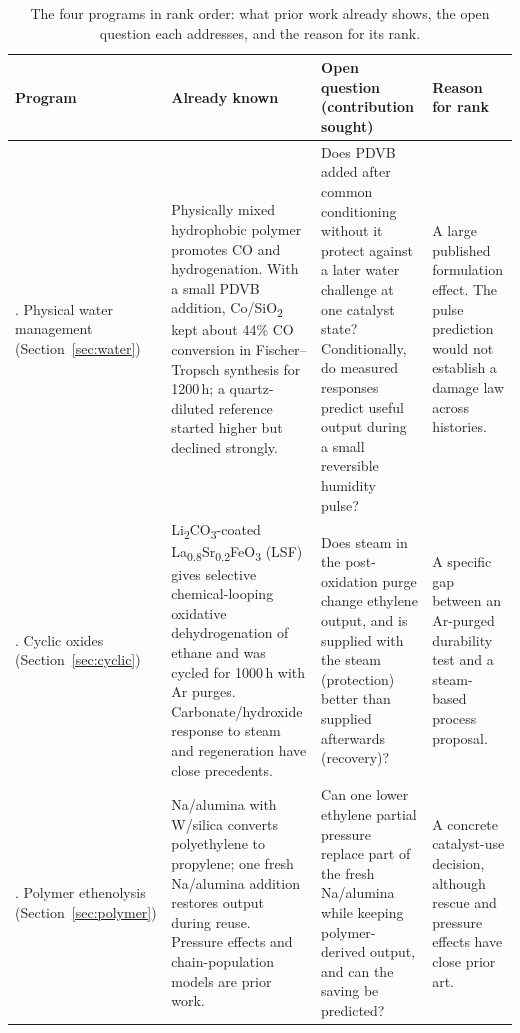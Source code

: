 \begin{table}[htbp]
\centering
\footnotesize
\renewcommand{\arraystretch}{1.2}
\caption{The four programs in rank order: what prior work already shows, the open question each addresses, and the reason for its rank.}
\label{tab:overview-ranking}
\begin{tabularx}{\textwidth}{@{}>{\raggedright\arraybackslash}p{}>{\raggedright\arraybackslash}X>{\raggedright\arraybackslash}X>{\raggedright\arraybackslash}p{}@{}}
\toprule
Program & Already known & Open question (contribution sought) & Reason for rank\\
\midrule
1. Physical water management (Section~\ref{sec:water}) & Physically mixed hydrophobic polymer promotes CO and \COtwo{} hydrogenation.\cite{fang2022,li2023} With a small PDVB addition, Co/SiO\textsubscript{2} kept about 44\% CO conversion in Fischer--Tropsch synthesis for 1200\,h; a quartz-diluted reference started higher but declined strongly.\cite{fang2026} & Does PDVB added after common conditioning without it protect against a later water challenge at one catalyst state? Conditionally, do measured responses predict useful output during a small reversible humidity pulse? & A large published formulation effect. The pulse prediction would not establish a damage law across histories.\\
2. Cyclic oxides (Section~\ref{sec:cyclic}) & Li\textsubscript{2}CO\textsubscript{3}-coated La\textsubscript{0.8}Sr\textsubscript{0.2}FeO\textsubscript{3} (LSF) gives selective chemical-looping oxidative dehydrogenation of ethane and was cycled for 1000\,h with Ar purges.\cite{gao2020,brody2022} Carbonate/hydroxide response to steam and \COtwo{} regeneration have close precedents.\cite{barckholtz2021,chacko2025thesis,fereres2018} & Does steam in the post-oxidation purge change ethylene output, and is \COtwo{} supplied with the steam (protection) better than \COtwo{} supplied afterwards (recovery)? & A specific gap between an Ar-purged durability test and a steam-based process proposal.\\
3. Polymer ethenolysis (Section~\ref{sec:polymer}) & Na/alumina with W/silica converts polyethylene to propylene; one fresh Na/alumina addition restores output during reuse.\cite[Fig.~4B]{conk2024} Pressure effects and chain-population models are prior work.\cite{wang2022thesis,guironnet2020,chen2024} & Can one lower ethylene partial pressure replace part of the fresh Na/alumina while keeping polymer-derived output, and can the saving be predicted? & A concrete catalyst-use decision, although rescue and pressure effects have close prior art.\\

\end{tabularx}
\end{table}
